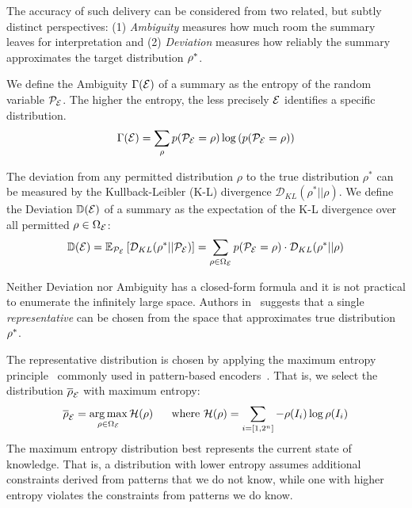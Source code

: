 The accuracy of such delivery can be considered from two related, but subtly distinct perspectives:
(1) \emph{Ambiguity} measures how much room the summary leaves for interpretation and 
(2) \emph{Deviation} measures how reliably the summary approximates the target distribution $\rho^*$.

\smallskip
{}
We define the Ambiguity $\Gamma(\mathcal E)$ of a summary as the entropy of the random variable $\mathcal P_\mathcal E$. 
The higher the entropy, the less precisely $\mathcal E$ identifies a specific distribution.
$$\Gamma(\mathcal E) = \operatorname*{\sum}\limits_{\rho}p(\mathcal P_\mathcal E = \rho)\log \left(p(\mathcal P_\mathcal E=\rho)\right)$$

The deviation from any permitted distribution $\rho$ to the true distribution $\rho^*$ can be measured by the Kullback-Leibler (K-L) divergence $\mathcal{D}_{KL}(\rho^*||\rho)$.
We define the Deviation $\mathbb{D}(\mathcal E)$ of a summary as the expectation of the K-L divergence over all permitted $\rho \in \Omega_\mathcal E$:
$$\mathbb{D}(\mathcal E)=\mathbb{E}_{\mathcal{P}_\mathcal E}\left[\mathcal{D}_{KL}(\rho^*||\mathcal{P}_\mathcal E)\right] = \sum_{\rho \in \Omega_\mathcal E} p(\mathcal P_\mathcal E = \rho) \cdot \mathcal{D}_{KL}(\rho^*||\rho)$$

Neither Deviation nor Ambiguity has a closed-form formula and it is not practical to enumerate the infinitely large space.
Authors in~\cite{xie2018query} suggests that a single \emph{representative} can be chosen from the space that approximates true distribution $\rho^*$.

The representative distribution is chosen by applying the maximum entropy principle~\cite{DBLP:journals/tssc/Jaynes68} commonly used in pattern-based encoders~\cite{DBLP:journals/tkdd/MampaeyVT12,DBLP:journals/pvldb/GebalyAGKS14}.
That is, we select the distribution $\overline{\rho}_{\mathcal E}$ with maximum entropy:
$$\overline{\rho}_{\mathcal E}=\operatorname*{arg\,max}\limits_{\rho\in\Omega_\mathcal E}\mathcal{H}(\rho)\;\;\;\;\;\;\text{where }\mathcal{H}(\rho)=\operatorname*{\sum}\limits_{i=[1,2^n]}-\rho(I_i)\log \rho(I_i)$$
The maximum entropy distribution best represents the current state of knowledge.
That is, a distribution with lower entropy assumes additional constraints derived from patterns that we do not know, while one with higher entropy violates the constraints from patterns we do know.

